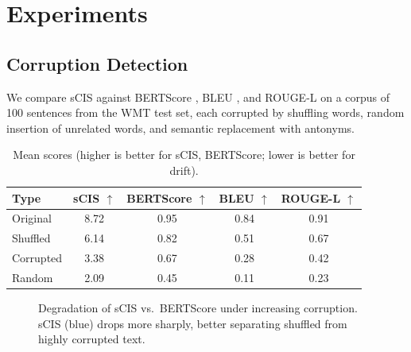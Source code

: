 \documentclass[11pt]{article}
\theoremstyle{definition}
\begin{document}
\section{Experiments}

\subsection{Corruption Detection}
We compare sCIS against BERTScore \cite{bertscore}, BLEU \cite{bleu}, and ROUGE-L \cite{lin2004rouge} on a corpus of 100 sentences from the WMT test set, each corrupted by shuffling words, random insertion of unrelated words, and semantic replacement with antonyms.

\begin{table}[htbp]
\centering
\caption{Mean scores (higher is better for sCIS, BERTScore; lower is better for drift).}
\begin{tabular}{lcccc}
\toprule
Type & sCIS $\uparrow$ & BERTScore $\uparrow$ & BLEU $\uparrow$ & ROUGE-L $\uparrow$ \\
\midrule
Original & 8.72 & 0.95 & 0.84 & 0.91 \\
Shuffled & 6.14 & 0.82 & 0.51 & 0.67 \\
Corrupted & 3.38 & 0.67 & 0.28 & 0.42 \\
Random & 2.09 & 0.45 & 0.11 & 0.23 \\
\bottomrule
\end{tabular}
\end{table}

\begin{figure}[htbp]
\centering
{}
\caption{Degradation of sCIS vs.\ BERTScore under increasing corruption. sCIS (blue) drops more sharply, better separating shuffled from highly corrupted text.}
\label{fig:decay}
\end{figure}
\end{document}
